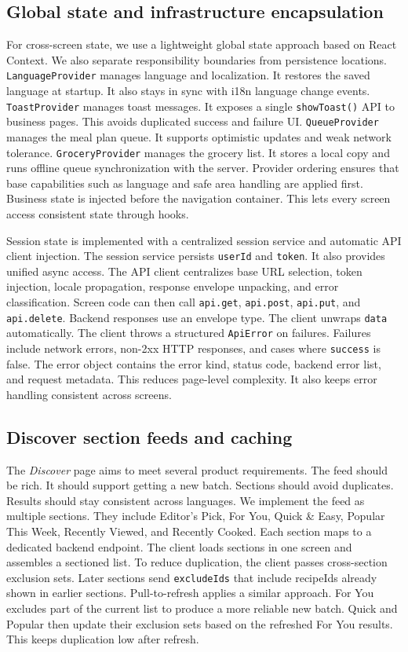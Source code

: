 \documentclass[journal]{IEEEtran}
\begin{document}
\subsection{Global state and infrastructure encapsulation}

For cross-screen state, we use a lightweight global state approach based on React Context. We also separate responsibility boundaries from persistence locations. \texttt{LanguageProvider} manages language and localization. It restores the saved language at startup. It also stays in sync with i18n language change events. \texttt{ToastProvider} manages toast messages. It exposes a single \texttt{showToast()} API to business pages. This avoids duplicated success and failure UI. \texttt{QueueProvider} manages the meal plan queue. It supports optimistic updates and weak network tolerance. \texttt{GroceryProvider} manages the grocery list. It stores a local copy and runs offline queue synchronization with the server. Provider ordering ensures that base capabilities such as language and safe area handling are applied first. Business state is injected before the navigation container. This lets every screen access consistent state through hooks.

Session state is implemented with a centralized session service and automatic API client injection. The session service persists \texttt{userId} and \texttt{token}. It also provides unified async access. The API client centralizes base URL selection, token injection, locale propagation, response envelope unpacking, and error classification. Screen code can then call \texttt{api.get}, \texttt{api.post}, \texttt{api.put}, and \texttt{api.delete}. Backend responses use an envelope type. The client unwraps \texttt{data} automatically. The client throws a structured \texttt{ApiError} on failures. Failures include network errors, non-2xx HTTP responses, and cases where \texttt{success} is false. The error object contains the error kind, status code, backend error list, and request metadata. This reduces page-level complexity. It also keeps error handling consistent across screens.

\subsection{Discover section feeds and caching}

The \textit{Discover} page aims to meet several product requirements. The feed should be rich. It should support getting a new batch. Sections should avoid duplicates. Results should stay consistent across languages. We implement the feed as multiple sections. They include Editor's Pick, For You, Quick \& Easy, Popular This Week, Recently Viewed, and Recently Cooked. Each section maps to a dedicated backend endpoint. The client loads sections in one screen and assembles a sectioned list. To reduce duplication, the client passes cross-section exclusion sets. Later sections send \texttt{excludeIds} that include recipeIds already shown in earlier sections. Pull-to-refresh applies a similar approach. For You excludes part of the current list to produce a more reliable new batch. Quick and Popular then update their exclusion sets based on the refreshed For You results. This keeps duplication low after refresh.
\end{document}
